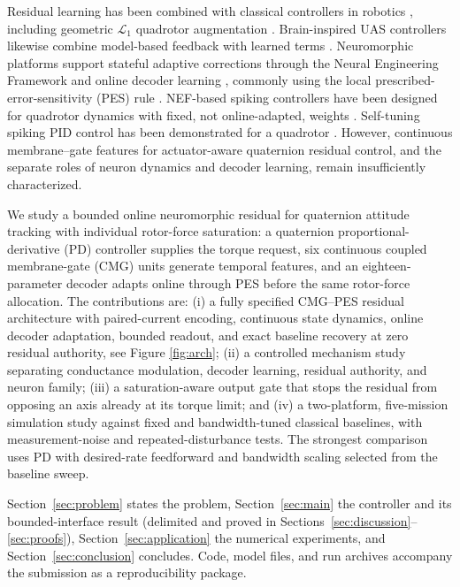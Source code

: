 \documentclass[letterpaper, 10 pt, conference]{ieeeconf}
\begin{document}
Residual learning has been combined with classical controllers in robotics \cite{johannink2019}, including geometric $\mathcal L_1$ quadrotor augmentation \cite{wu2025l1quad}. Brain-inspired UAS controllers likewise combine model-based feedback with learned terms \cite{rubioscola2023limbic,rubioscola2021mambo}. Neuromorphic platforms support stateful adaptive corrections through the Neural Engineering Framework and online decoder learning \cite{eliasmith2004neuraleng,bekolay2014nengo}, commonly using the local prescribed-error-sensitivity (PES) rule \cite{voelker2015pes}. NEF-based spiking controllers have been designed for quadrotor dynamics with fixed, not online-adapted, weights \cite{garciaalcantara2024snnuas}. Self-tuning spiking PID control has been demonstrated for a quadrotor \cite{olivares2026selftuning}. However, continuous membrane--gate features for actuator-aware quaternion residual control, and the separate roles of neuron dynamics and decoder learning, remain insufficiently characterized.

We study a bounded online neuromorphic residual for quaternion attitude tracking with individual rotor-force saturation: a quaternion proportional-derivative (PD) controller supplies the torque request, six continuous coupled membrane-gate (CMG) units generate temporal features, and an eighteen-parameter decoder adapts online through PES before the same rotor-force allocation. The contributions are: (i) a fully specified CMG--PES residual architecture with paired-current encoding, continuous state dynamics, online decoder adaptation, bounded readout, and exact baseline recovery at zero residual authority, see Figure \ref{fig:arch}; (ii) a controlled mechanism study separating conductance modulation, decoder learning, residual authority, and neuron family; (iii) a saturation-aware output gate that stops the residual from opposing an axis already at its torque limit; and (iv) a two-platform, five-mission simulation study against fixed and bandwidth-tuned classical baselines, with measurement-noise and repeated-disturbance tests. The strongest comparison uses PD with desired-rate feedforward and bandwidth scaling selected from the baseline sweep.

Section~\ref{sec:problem} states the problem, Section~\ref{sec:main} the controller and its bounded-interface result (delimited and proved in Sections~\ref{sec:discussion}--\ref{sec:proofs}), Section~\ref{sec:application} the numerical experiments, and Section~\ref{sec:conclusion} concludes. Code, model files, and run archives accompany the submission as a reproducibility package.
\end{document}
